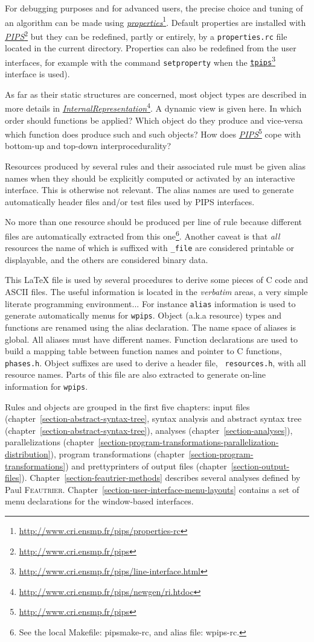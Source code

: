 \documentclass[a4paper]{report}
\newcommand{\LINK}[2]{\href{#2}{#1}\footnote{\url{#2}}\xspace}
\newcommand{\PIPS}{\LINK{\emph{PIPS}}{http://www.cri.ensmp.fr/pips}}
\newcommand{\PROPERTIES}{\LINK{\emph{properties}}{http://www.cri.ensmp.fr/pips/properties-rc}}
\newcommand{\Pri}{\LINK{\emph{Internal\space{}Representation}}{http://www.cri.ensmp.fr/pips/newgen/ri.htdoc}}
\newcommand{\TPIPS}{\LINK{\texttt{tpips}}{http://www.cri.ensmp.fr/pips/line-interface.html}}
\begin{document}
For debugging purposes and for advanced users, the precise choice and
tuning of an algorithm can be made using \PROPERTIES{}. Default properties
are installed with \PIPS{} but they can be redefined, partly or entirely,
by a {\tt properties.rc} file located in the current directory. Properties
can also be redefined from the user interfaces, for example with the command
\texttt{setproperty} when the \TPIPS{} interface is used).

As far as their static structures are concerned, most object types are
described in more details in \Pri. A
dynamic view is given here. In which order should functions be applied?
Which object do they produce and vice-versa which function does produce
such and such objects? How does \PIPS{} cope with bottom-up and top-down
interprocedurality?

Resources produced by several rules and their associated rule must be
given alias names when they should be explicitly computed or activated by an
interactive interface. This is otherwise not relevant. The alias names are
used to generate automatically header files and/or test files used by PIPS
interfaces.

No more than one resource should be produced per line of rule because
different files are automatically extracted from this one\footnote{See
the local Makefile: pipsmake-rc, and alias file: wpips-rc.}. Another
caveat is that \emph{all} resources the name of which is suffixed with
\verb|_file| are considered printable or displayable, and the others
are considered binary data.

This \LaTeX{} file is used by several procedures to derive some pieces of C
code and ASCII files. The useful information is located in the {\em
  verbatim} areas, a very simple literate programming environment... For
instance \verb+alias+ information is used to generate automatically menus
for \verb+wpips+. Object (a.k.a resource) types and functions are renamed
using the alias declaration. The name space of aliases is global. All
aliases must have different names. Function declarations are used to build
a mapping table between function names and pointer to C functions,
\texttt{phases.h}. Object suffixes are used to derive a header file, {\tt
  resources.h}, with all resource names. Parts of this file are also
extracted to generate on-line information for {\tt wpips}.

Rules and objects are grouped in the first five chapters: input files
(chapter~\ref{section-abstract-syntax-tree}, syntax analysis and abstract
syntax tree (chapter~\ref{section-abstract-syntax-tree}), analyses
(chapter~\ref{section-analyses}), parallelizations
(chapter~\ref{section-program-transformations-parallelization-distribution}),
program transformations (chapter~\ref{section-program-transformations})
and prettyprinters of output files (chapter~\ref{section-output-files}).
Chapter~\ref{section-feautrier-methods} describes several analyses defined
by Paul
\textsc{Feautrier}. Chapter~\ref{section-user-interface-menu-layouts}
contains a set of menu declarations for the window-based interfaces.
\end{document}

